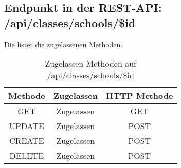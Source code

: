 \subsection{Endpunkt in der REST-API: /api/classes/schools/\$id}
Die  listet die zugelassenen Methoden. 

\begin{table}[!htbp]
	\begin{tabular}{|c|c|c|}
		\hline
			\textbf{Methode} & \textbf{Zugelassen} & \textbf{HTTP Methode} \\ \hline
			GET & Zugelassen & GET \\ \hline
			UPDATE & Zugelassen & POST \\ \hline 
			CREATE & Zugelassen & POST \\ \hline 
			DELETE & Zugelassen & POST \\ \hline
	\end{tabular}

		\caption{Zugelassen Methoden auf /api/classes/schools/\$id}
		\label{tab:end:rest:api:classes:schools:id:meth}
\end{table}
